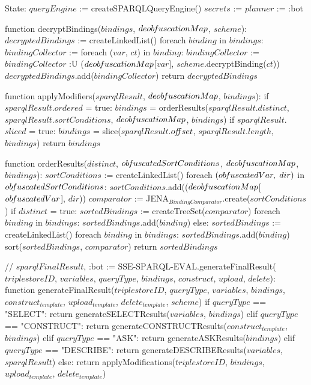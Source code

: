 State:
    $queryEngine$ := createSPARQLQueryEngine()
    $secrets$ := {}
    $planner$ := :bot

function decryptBindings($bindings$, $deob\textrm{\emph{f}}uscationMap$, $scheme$):
    $decryptedBindings$ := createLinkedList()
    foreach $binding$ in $bindings$:
        $bindingCollector$ := {}
        foreach ($var$, $ct$) in $binding$:
            $bindingCollector$ := $bindingCollector$ :U { ($deob\textrm{\emph{f}}uscationMap$[$var$], $scheme$.decryptBinding($ct$)) }
        $decryptedBindings$.add($bindingCollector$)
    return $decryptedBindings$

function applyModifiers($sparqlResult$, $deob\textrm{\emph{f}}uscationMap$, $bindings$):
    if $sparqlResult$.$ordered$ = true:
        $bindings$ = orderResults($sparqlResult$.$distinct$, $sparqlResult$.$sortConditions$, $deob\textrm{\emph{f}}uscationMap$, $bindings$)
    if $sparqlResult$.$sliced$ = true:
        $bindings$ = slice($sparqlResult$.$o\textrm{\emph{ff}}set$, $sparqlResult$.$length$, $bindings$)
    return $bindings$

function orderResults($distinct$, $ob\textrm{\emph{f}}uscatedSortConditions$, $deob\textrm{\emph{f}}uscationMap$, $bindings$):
    $sortConditions$ := createLinkedList()
    foreach $(ob\textrm{\emph{f}}uscatedVar, \; dir)$ in $ob\textrm{\emph{f}}uscatedSortConditions$:
        $sortConditions$.add(($deob\textrm{\emph{f}}uscationMap$[$ob\textrm{\emph{f}}uscatedVar$], $dir$))
    $comparator$ := JENA$_{BindingComparator}$.create($sortConditions$)
    if $distinct$ = true:
        $sortedBindings$ := createTreeSet($comparator$)
        foreach $binding$ in $bindings$:
            $sortedBindings$.add($binding$)
    else:
        $sortedBindings$ := createLinkedList()
        foreach $binding$ in $bindings$:
            $sortedBindings$.add($binding$)
        sort($sortedBindings$, $comparator$)
    return $sortedBindings$

// {$sparqlFinalResult$, :bot} := $\textrm{SSE-SPARQL-EVAL}$.generateFinalResult($triplestoreID$, $variables$, $queryType$, $bindings$, $construct$, $upload$, $delete$):
function generateFinalResult($triplestoreID$, $queryType$, $variables$, $bindings$, $construct_{template}$, $upload_{template}$, $delete_{template}$, $scheme$)
    if $queryType$ == "SELECT":
        return generateSELECTResults($variables$, $bindings$)
    elif $queryType$ == "CONSTRUCT":
        return generateCONSTRUCTResults($construct_{template}$, $bindings$)
    elif $queryType$ == "ASK":
        return generateASKResults($bindings$)
    elif $queryType$ == "DESCRIBE":
        return generateDESCRIBEResults($variables$, $sparqlResult$)
    else:
        return applyModifications($triplestoreID$, $bindings$, $upload_{template}$, $delete_{template}$)   

